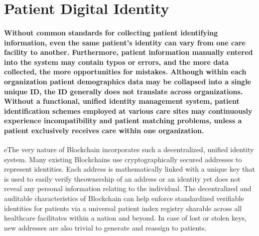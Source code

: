 \documentclass[12pt]{report}
\begin{document}
\section{Patient Digital Identity}
\paragraph{Without common standards for collecting patient identifying information, even the
same patient’s identity can vary from one care facility to another.  Furthermore, patient information manually
entered into the system may contain typos or errors, and the more data collected, the more
opportunities for mistakes. Although within each organization patient demographics data
may be collapsed into a single unique ID, the ID generally does not translate across organizations.
Without a functional, unified identity management system, patient identification
schemes employed at various care sites may continuously experience incompatibility and patient matching problems, unless a patient exclusively receives care within one organization.}
\par
eThe very nature of Blockchain incorporates such a decentralized, unified identity system. Many existing Blockchains use cryptographically secured addresses to represent identities. Each address is mathematically linked with a unique key that is used to easily verify theownership of an address or an identity yet does not reveal any personal information relating
to the individual. The decentralized and auditable characteristics of Blockchain can help enforce standardized verifiable identities for patients via a universal patient index registry sharable across all healthcare facilitates within a nation and beyond. In case of lost or stolen keys, new addresses are also trivial to generate and reassign to patients.
\end{document}
